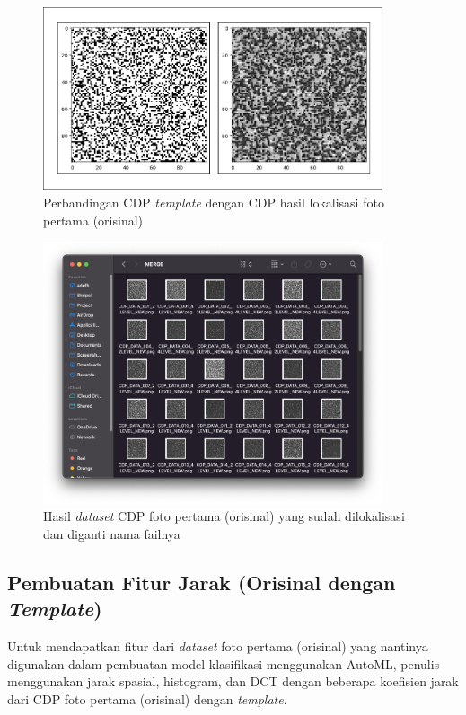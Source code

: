 \begin{figure}[h]
	\centering
	\includegraphics[width=10cm]{contents/chapter-3/3-templatevslokalisasi.png}
	\caption{Perbandingan CDP \emph{template} dengan CDP hasil lokalisasi foto pertama (orisinal)}
	\label{Fig: 3-templatevslokalisasi}
\end{figure}

\begin{figure}[h]
	\centering
	\includegraphics[width=10cm]{contents/chapter-3/3-hasildatasetcdp.png}
	\caption{Hasil \emph{dataset} CDP foto pertama (orisinal) yang sudah dilokalisasi dan diganti nama failnya}
	\label{Fig: 3-hasildatasetcdp}
\end{figure}

\subsection{Pembuatan Fitur Jarak (Orisinal dengan \emph{Template})} \label{Pembuatan Fitur Jarak {Orisinal dengan Template}}
Untuk mendapatkan fitur dari \emph{dataset} foto pertama (orisinal) yang nantinya digunakan dalam pembuatan model klasifikasi menggunakan AutoML, penulis menggunakan jarak spasial, histogram, dan DCT dengan beberapa koefisien jarak dari CDP foto pertama (orisinal) dengan \emph{template}.

